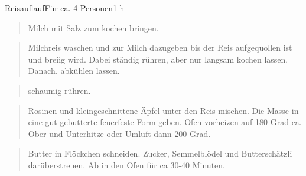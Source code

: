 \documentclass[
  a4paper,
]{article}
\begin{document}
\begin{recipe}{Reisauflauf}{Für ca. 4 Personen}{1 h}


\begin{quote}
Milch mit Salz zum kochen bringen.
\end{quote}

\freeform\hrulefill


\begin{quote}
Milchreis waschen und zur Milch dazugeben bis der Reis aufgequollen ist
und breiig wird. Dabei ständig rühren, aber nur langsam kochen lassen.
Danach. abkühlen lassen.
\end{quote}

\freeform\hrulefill


\begin{quote}
schaumig rühren.
\end{quote}

\freeform\hrulefill


\begin{quote}
Rosinen und kleingeschnittene Äpfel unter den Reis mischen. Die Masse in
eine gut gebutterte feuerfeste Form geben. Ofen vorheizen auf 180 Grad
ca. Ober und Unterhitze oder Umluft dann 200 Grad.
\end{quote}

\freeform\hrulefill


\begin{quote}
Butter in Flöckchen schneiden. Zucker, Semmelblödel und Butterschätzli
darüberstreuen. Ab in den Ofen für ca 30-40 Minuten.
\end{quote}

\freeform\hrulefill\newline{}\end{recipe}

\newpage
\end{document}

